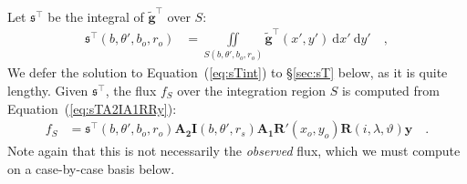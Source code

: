 \documentclass[modern]{aastex62}
\newcommand{\BF}[1]{\ensuremath{\mathbf{#1}}}
\newcommand{\dd}{\ensuremath{\mathrm{d}}}
\newcommand{\sT}{\ensuremath{\mathfrak{s}^\top}}
\newcommand{\bg}{\ensuremath{\tilde{\BF{g}}}}
\begin{document}
Let $\sT$ be the integral of $\bg^\top$ over $S$:
%
\begin{align}
    \label{eq:sTint}
    \sT(b, \theta', b_o, r_o) & =
    \iint\limits_{S(b, \theta', b_o, r_o)}
    \bg^\top(x', y')
    \ \dd x' \ \dd y'
    \quad,
\end{align}
%
We defer the solution to Equation~(\ref{eq:sTint}) to \S\ref{sec:sT} below,
as it is quite lengthy. Given $\sT$, the flux $f_S$ over the integration
region $S$ is computed from Equation~(\ref{eq:sTA2IA1RRy}):
%
\begin{align}
    \label{eq:fS}
    f_S & =
    \mathfrak{s}^\top(b, \theta', b_o, r_o)
    \BF{A_2}
    \BF{I}(b, \theta', r_s)
    \BF{A_1}
    \BF{R}'(x_o, y_o)
    \BF{R}(i, \lambda, \vartheta)
    \BF{y}
    \quad.
\end{align}
%
Note again that this is not necessarily the \emph{observed} flux, which we must
compute on a case-by-case basis below.
\end{document}
